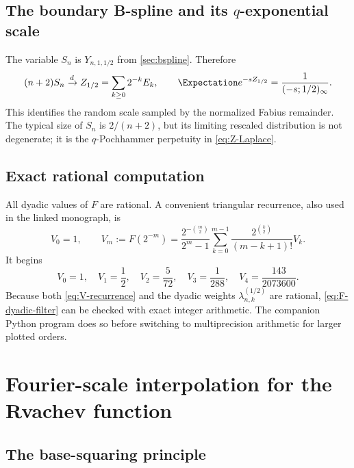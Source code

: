 \documentclass[11pt,oneside]{article}
\numberwithin{equation}{section}
\theoremstyle{definition}
\theoremstyle{remark}
\begin{document}
\subsection{The boundary B-spline and its $q$-exponential scale}

The variable $S_n$ is $Y_{n,1,1/2}$ from \cref{sec:bspline}.  Therefore
\begin{equation}
 (n+2)S_n\xrightarrow{d}Z_{1/2}
 =\sum_{k\ge0}2^{-k}E_k,
 \qquad
 \Expectation e^{-sZ_{1/2}}=\frac1{(-s;1/2)_\infty}.
 \label{eq:Sn-limit}
\end{equation}
This identifies the random scale sampled by the normalized Fabius remainder.
The typical size of $S_n$ is $2/(n+2)$, but its limiting rescaled distribution
is not degenerate; it is the $q$-Pochhammer perpetuity in
\eqref{eq:Z-Laplace}.

\subsection{Exact rational computation}

All dyadic values of $F$ are rational.  A convenient triangular recurrence,
also used in the linked monograph, is
\begin{equation}
 V_0=1,\qquad
 V_m:=F(2^{-m})
 =\frac{2^{-\binom m2}}{2^m-1}
 \sum_{k=0}^{m-1}
 \frac{2^{\binom k2}}{(m-k+1)!}V_k.
 \label{eq:V-recurrence}
\end{equation}
It begins
\[
 V_0=1,\quad V_1=\frac12,\quad V_2=\frac5{72},\quad
 V_3=\frac1{288},\quad V_4=\frac{143}{2073600}.
\]
Because both \eqref{eq:V-recurrence} and the dyadic weights
$\lambda_{n,k}^{(1/2)}$ are rational, \eqref{eq:F-dyadic-filter} can be checked
with exact integer arithmetic.  The companion Python program does so before
switching to multiprecision arithmetic for larger plotted orders.

\section{Fourier-scale interpolation for the Rvachev function}
\label{sec:fourier}

\subsection{The base-squaring principle}
\end{document}
